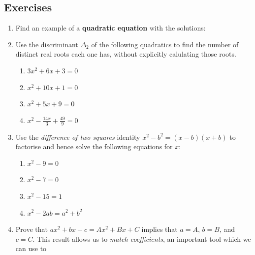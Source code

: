 \documentclass[a4paper,10pt,titlepage]{article}
\theoremstyle{definition}
\newcommand{\hard}{\refstepcounter{enumi}\item[$^\star$\theenumi.]}
\begin{document}
\subsection*{Exercises}
\begin{enumerate}
  \item Find an example of a \textbf{quadratic equation} with the solutions:
  \item Use the discriminant $ \Delta_2 $ of the following quadratics to find the
        number of distinct real roots each one has, without explicitly calulating
        those roots.
        \begin{multicols}{2}
        \begin{enumerate}
          \item $ 3x^2 + 6x + 3 = 0 $
          \item $ x^2 + 10x + 1 = 0 $
          \item $ x^2 + 5x + 9 = 0 $
          \item $ x^2 - \frac{14x}{3} + \frac{49}{9} = 0 $
        \end{enumerate}
        \end{multicols}
  \item Use the \emph{difference of two squares} identity $ x^2 - b^2 = (x-b)(x+b) $ to factorise and hence
        solve the following equations for $ x $:
        \begin{multicols}{2}
        \begin{enumerate}
          \item $ x^2 - 9 = 0 $
          \item $ x^2 - 7 = 0 $
          \item $ x^2 - 15 = 1 $
          \item $ x^2 - 2ab = a^2 + b^2 $
        \end{enumerate}
        \end{multicols}
  \hard Prove that $ ax^2 + bx + c = Ax^2 + Bx + C $ implies that $ a = A $, $ b = B $, and $ c = C $.
        This result allows us to \textit{match coefficients}, an important tool which we can use to

\end{enumerate}
\end{document}
